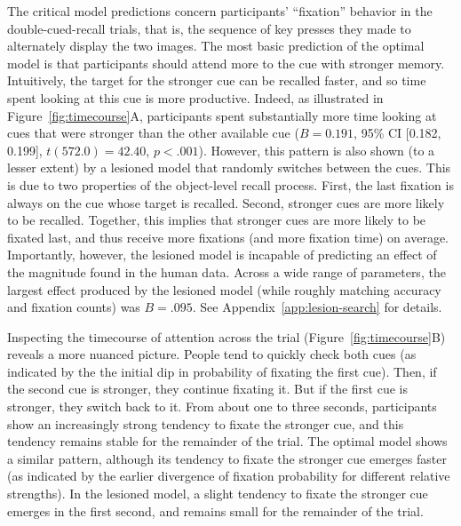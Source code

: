 The critical model predictions concern participants' ``fixation'' behavior in the double-cued-recall trials, that is, the sequence of key presses they made to alternately display the two images. The most basic prediction of the optimal model is that participants should attend more to the cue with stronger memory. Intuitively, the target for the stronger cue can be recalled faster, and so time spent looking at this cue is more productive. Indeed, as illustrated in Figure~\ref{fig:timecourse}A, participants spent substantially more time looking at cues that were stronger than the other available cue ($B = 0.191$, 95\% CI [0.182, 0.199], $t(572.0)=42.40$, $p < .001$). However, this pattern is also shown (to a lesser extent) by a lesioned model that randomly switches between the cues. This is due to two properties of the object-level recall process. First, the last fixation is always on the cue whose target is recalled. Second, stronger cues are more likely to be recalled. Together, this implies that stronger cues are more likely to be fixated last, and thus receive more fixations (and more fixation time) on average. Importantly, however, the lesioned model is incapable of predicting an effect of the magnitude found in the human data. Across a wide range of parameters, the largest effect produced by the lesioned model (while roughly matching accuracy and fixation counts) was $B = .095$. See Appendix~\ref{app:lesion-search} for details.

Inspecting the timecourse of attention across the trial (Figure~\ref{fig:timecourse}B) reveals a more nuanced picture. People tend to quickly check both cues (as indicated by the the initial dip in probability of fixating the first cue). Then, if the second cue is stronger, they continue fixating it. But if the first cue is stronger, they switch back to it. From about one to three seconds, participants show an increasingly strong tendency to fixate the stronger cue, and this tendency remains stable for the remainder of the trial. The optimal model shows a similar pattern, although its tendency to fixate the stronger cue emerges faster (as indicated by the earlier divergence of fixation probability for different relative strengths). In the lesioned model, a slight tendency to fixate the stronger cue emerges in the first second, and remains small for the remainder of the trial.

